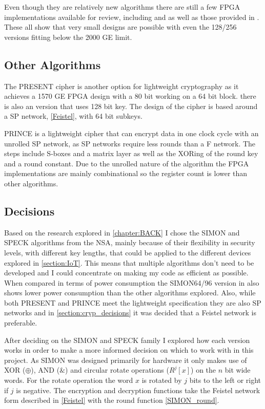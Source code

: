 \documentclass[12pt,twoside,a4paper]{report}
\begin{document}
	Even though they are relatively new algorithms there are still a few FPGA implementations available for review, including \cite{Aysu2014} and \cite{Shahverdi2015} as well as those provided in \cite{Beaulieu2013}. These all show that very small designs are possible with even the 128/256 versions fitting below the 2000 GE limit.
    
	\subsection{Other Algorithms}
	The PRESENT cipher is another option for lightweight cryptography as it achieves a 1570 GE FPGA design with a 80 bit working on a 64 bit block. there is also an version that uses 128 bit key. The design of the cipher is based around a SP network, \autoref{Feistel}, with 64 bit subkeys.
    
	PRINCE is a lightweight cipher that can encrypt data in one clock cycle with an unrolled SP network, as SP networks require less rounds than a F network. The steps include S-boxes and a matrix layer as well as the XORing of the round key and a round constant. Due to the unrolled nature of the algorithm the FPGA implementations are mainly combinational so the register count is lower than other algorithms.
    
	\subsection{Decisions}
	Based on the research explored in \autoref{chapter:BACK} I chose the SIMON and SPECK algorithms from the NSA, mainly because of their flexibility in security levels, with different key lengths, that could be applied to the different devices explored in \autoref{section:IoT}. This means that multiple algorithms don't need to be developed and I could concentrate on making my code as efficient as possible. When compared in terms of power consumption the SIMON64/96 version in \cite{Banik2015} also shows lower power consumption than the other algorithms explored. Also, while both PRESENT and PRINCE meet the lightweight specification they are also SP networks and in \autoref{section:cryp_decisions} it was decided that a Feistel network is preferable.
    
	After deciding on the SIMON and SPECK family I explored how each version works in order to make a more informed decision on which to work with in this project. As SIMON was designed primarily for hardware it only makes use of XOR ($\oplus$), AND ($\&$) and circular rotate operations ($R^j[x]$) on the $n$ bit wide words. For the rotate operation the word $x$ is rotated by $j$ bits to the left or right if $j$ is negative. The encryption and decryption functions take the Feistel network form described in \autoref{Feistel} with the round function \autoref{SIMON_round}.
    
\end{document}
